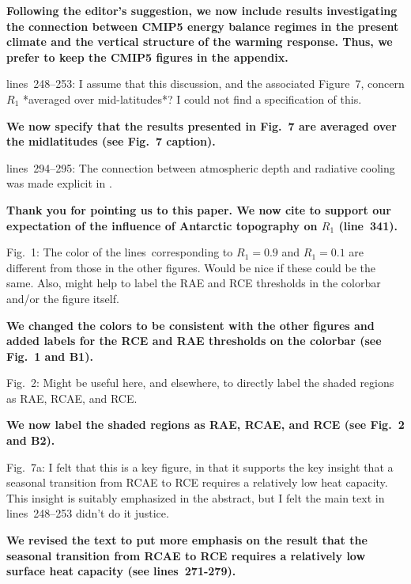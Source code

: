 \documentclass{article}
\begin{document}
\textbf{Following the editor's suggestion, we now include results investigating the connection between CMIP5 energy balance regimes in the present climate and the vertical structure of the warming response. Thus, we prefer to keep the CMIP5 figures in the appendix.}

lines~248--253: I assume that this discussion, and the associated Figure~7, concern $R_1$ *averaged over mid-latitudes*? I could not find a specification of this.

\textbf{We now specify that the results presented in Fig.~7 are averaged over the midlatitudes (see Fig.~7 caption).}

lines~294--295: The connection between atmospheric depth and radiative cooling was made explicit in \cite{jeevanjee2018}.

\textbf{Thank you for pointing us to this paper. We now cite \cite{jeevanjee2018} to support our expectation of the influence of Antarctic topography on $R_1$ (line~341).}

Fig.~1: The color of the lines~corresponding to $R_1=0.9$ and $R_1=0.1$ are different from those in the other figures. Would be nice if these could be the same. Also, might help to label the RAE and RCE thresholds in the colorbar and/or the figure itself.

\textbf{We changed the colors to be consistent with the other figures and added labels for the RCE and RAE thresholds on the colorbar (see Fig.~1 and B1).}

Fig.~2: Might be useful here, and elsewhere, to directly label the shaded regions as RAE, RCAE, and RCE.

\textbf{We now label the shaded regions as RAE, RCAE, and RCE (see Fig.~2 and B2).}

Fig.~7a: I felt that this is a key figure, in that it supports the key insight that a seasonal transition from RCAE to RCE requires a relatively low heat capacity. This insight is suitably emphasized in the abstract, but I felt the main text in lines~248--253 didn't do it justice.

\textbf{We revised the text to put more emphasis on the result that the seasonal transition from RCAE to RCE requires a relatively low surface heat capacity (see lines~271-279).}




\end{document}
